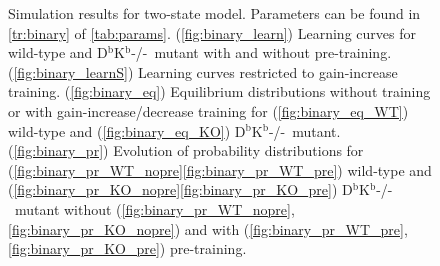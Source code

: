 \documentclass[12pt]{article}
\newcommand{\KO}{D$^\mathrm{b}$K$^\mathrm{b}$-/-}
\begin{document}
\begin{figure}
 \begin{center}
 \begin{myenuma}
  \item{}\label{fig:binary_learn}
  \item{}\label{fig:binary_learnS}
  \item\label{fig:binary_eq}\begin{myenumi}
                    \item{}\label{fig:binary_eq_WT}
                    \item{}\label{fig:binary_eq_KO}
                  \end{myenumi}
  \item\label{fig:binary_pr}\begin{myenumi}
                    \item{}\label{fig:binary_pr_WT_nopre}
                    \item{}\label{fig:binary_pr_WT_pre}
                    \item{}\label{fig:binary_pr_KO_nopre}
                    \item{}\label{fig:binary_pr_KO_pre}
                  \end{myenumi}
 \end{myenuma}
 \end{center}
  \caption{Simulation results for two-state model.
  Parameters can be found in \autoref{tr:binary} of \autoref{tab:params}.
  (\ref{fig:binary_learn}) Learning curves for wild-type and \KO\ mutant with and without pre-training.
  (\ref{fig:binary_learnS}) Learning curves restricted to gain-increase training.
  (\ref{fig:binary_eq}) Equilibrium distributions without training or with gain-increase/decrease training for (\ref{fig:binary_eq_WT}) wild-type and (\ref{fig:binary_eq_KO}) \KO\ mutant.
  (\ref{fig:binary_pr}) Evolution of probability distributions for (\ref{fig:binary_pr_WT_nopre}\ref{fig:binary_pr_WT_pre}) wild-type and  (\ref{fig:binary_pr_KO_nopre}\ref{fig:binary_pr_KO_pre}) \KO\ mutant without (\ref{fig:binary_pr_WT_nopre},\ref{fig:binary_pr_KO_nopre}) and with (\ref{fig:binary_pr_WT_pre},\ref{fig:binary_pr_KO_pre}) pre-training. } \label{fig:binary_res}
\end{figure}
\end{document}
